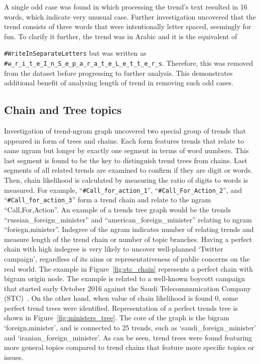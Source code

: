 \documentclass{comjnl}
\begin{document}
A single odd case was found in which processing the trend’s text resulted in 16 words, which indicate very unusual case. Further investigation uncovered that the trend consists of three words that were intentionally letter spaced, seemingly for fun. To clarify it further, the trend was in Arabic and it is the equivalent of {\texttt{\#WriteInSeparateLetters} but was written as {\footnotesize{{\texttt{\#w\_r\_i\_t\_e\_I\_n\_S\_e\_p\_a\_r\_a\_t\_e\_L\_e\_t\_t\_e\_r\_s}}}}. Therefore, this was removed from the dataset before progressing to further analysis. This demonstrates additional benefit of analysing length of trend in removing such odd cases.

\subsection{Chain and Tree topics}

Investigation of trend-ngram graph uncovered two special group of trends that appeared in form of trees and chains.  Each form features trends that relate to same ngram but longer by exactly one segment in terms of word numbers. This last segment is found to be the key to distinguish trend trees from chains. Last segments of all related trends are examined to confirm if they are digit or words. Then, chain likelihood is calculated by measuring the ratio of digits to words is measured.  For example, “{\texttt{\#Call\_for\_action\_1}}”, “{\texttt{\#Call\_For\_Action\_2}}”, and “{\texttt{\#Call\_for\_action\_3}}” form a trend chain and relate to the ngram “Call,For,Action”. An example of a trends tree graph would be the trends “russian\_foreign\_minister” and “american\_foreign\_minister” relating to ngram “foriegn,minister”. Indegree of the ngram indicates number of relating trends and measure length of the trend chain or number of topic branches. Having a perfect chain with high indegree is very likely to uncover well-planned ‘Twitter campaign’, regardless of its aims or representativeness of public concerns on the real world.  The example in Figure~\ref{fig:stc_chain} represents a perfect chain with bigram origin node. The example is related to a well-known boycott campaign that started early October 2016 against the Saudi Telecommunication Company (STC)~\cite{naffee-2016}.  On the other hand, when value of chain likelihood is found 0, some perfect trend trees were identified. Representation of a perfect trends tree is shown in Figure~\ref{fig:ministers_tree}.  The core of the graph is the bigram ‘foreign,minister’, and is connected to 25 trends, such as ‘saudi\_foreign\_minister’ and ‘iranian\_foreign\_minister’. As can be seen, trend trees were found featuring more general topics compared to trend chains that feature more specific topics or issues.

}
\end{document}
